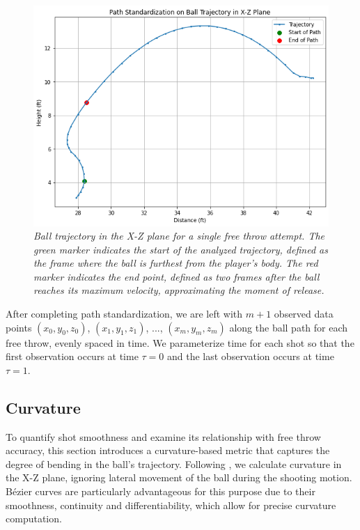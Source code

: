 \documentclass{article}
\begin{document}
      \begin{figure}[H]
        \centering
        \includegraphics[scale=0.4]{reports/arxiv/path_standardization.png}
        \caption{\it Ball trajectory in the X-Z plane for a single free throw attempt. The green marker indicates the start of the analyzed trajectory, defined as the frame where the ball is furthest from the player’s body. The red marker indicates the end point, defined as two frames after the ball reaches its maximum velocity, approximating the moment of release.}
        \label{fig:path-standardization}
      \end{figure}

      After completing path standardization, we are left with $m + 1$ observed data points \((x_0, y_0, z_0)\), \((x_1, y_1, z_1)\), ..., \((x_m, y_m, z_m)\) along the ball path for each free throw, evenly spaced in time. We parameterize time for each shot so that the first observation occurs at time $\tau = 0$ and the last observation occurs at time $\tau = 1$.

    \subsection{Curvature}
    \label{sec:curvature}
    
    To quantify shot smoothness and examine its relationship with free throw accuracy, this section introduces a curvature-based metric that captures the degree of bending in the ball's trajectory. Following \citet{slegers_role_2024}, we calculate curvature in the X-Z plane, ignoring lateral movement of the ball during the shooting motion. Bézier curves are particularly advantageous for this purpose due to their smoothness, continuity and differentiability, which allow for precise curvature computation. 
\end{document}
